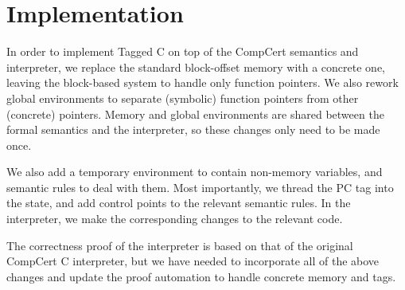 \documentclass{llncs}
\begin{document}


\section{Implementation}
\label{sec:implementation}

In order to implement Tagged C on top of the CompCert semantics and interpreter,
we replace the standard block-offset memory with a concrete one,
leaving the block-based system to handle only function pointers. We also rework
global environments to separate (symbolic) function pointers from other (concrete)
pointers. Memory and global environments are shared between the formal
semantics and the interpreter, so these changes only need to be made once.

We also add a temporary environment to contain non-memory variables,
and semantic rules to deal with them. Most importantly, we thread the PC tag into the state,
and add control points to the relevant semantic rules. In the interpreter, we make
the corresponding changes to the relevant code.

The correctness proof of the interpreter is based on that of the original \mbox{CompCert} C
interpreter, but we have needed to incorporate all of the above changes and update
the proof automation to handle concrete memory and tags.
\end{document}
